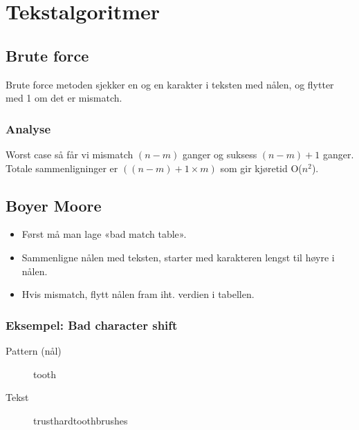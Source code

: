 \documentclass[11pt,a4paper]{article}
\theoremstyle{def}
\begin{document}
\section{Tekstalgoritmer}

\subsection{Brute force}
Brute force metoden sjekker en og en karakter i teksten med nålen, og flytter med 1 om det er mismatch.

\subsubsection{Analyse}
Worst case så får vi mismatch $(n-m)$ ganger og suksess $(n-m)+1$ ganger. Totale sammenligninger er $((n-m)+1 \times m)$ som gir kjøretid O($n^2$).

\subsection{Boyer Moore}
\begin{itemize}
\item
Først må man lage «bad match table».
\item
Sammenligne nålen med teksten, starter med karakteren lengst til høyre i nålen.
\item
Hvis mismatch, flytt nålen fram iht. verdien i tabellen.
\end{itemize}

\subsubsection{Eksempel: Bad character shift}
\begin{description}
\item[Pattern (nål)] tooth
\item[Tekst] trusthardtoothbrushes
\end{description}
\end{document}
